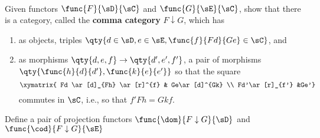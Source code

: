 \documentclass[main.tex]{subfiles}
\begin{document}
\paragraph{}
\begin{exercise}
	Given functors $\func{F}{\sD}{\sC}$ and $\func{G}{\sE}{\sC}$, show that
	there is a category, called the {\bf comma category} $F\downarrow G$, which
	has
	\begin{enumerate}
		\item as objects, triples $\qty{d \in \sD,e \in \sE, \func{f}{Fd}{Ge}
			\in \sC}$, and

		\item as morphisms $\qty{d,e,f}\rightarrow \qty{d',e',f'}$, a pair of
			morphisms $\qty{\func{h}{d}{d'},\func{k}{e}{e'}}$ so that the square
			\[\xymatrix{
					Fd \ar[d]_{Fh} \ar[r]^{f} & Ge\ar[d]^{Gk}  \\
			Fd'\ar[r]_{f'} &Ge'}\]
			commutes in $\sC$, i.e., so that $f' Fh = Gk  f$.
	\end{enumerate}
	Define a pair of projection functors $\func{\dom}{F\downarrow G}{\sD}$ and
	$\func{\cod}{F\downarrow G}{\sE}$
\end{exercise}
\end{document}
